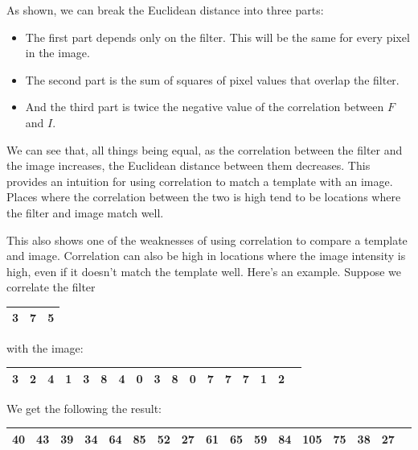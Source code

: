 \documentclass{report}
\begin{document}
As shown, we can break the Euclidean distance into three parts:
\begin{itemize}
    \item The first part depends only on the filter. This will be the same for every pixel in the image.
    \item The second part is the sum of squares of pixel values that overlap the filter.
    \item And the third part is twice the negative value of the correlation between $F$ and $I$.
\end{itemize}

We can see that, all things being equal, as the correlation between the filter and the image increases, the Euclidean distance between them decreases. This provides an intuition for using correlation to match a template with an image. Places where the correlation between the two is high tend to be locations where the filter and image match well.

This also shows one of the weaknesses of using correlation to compare a template and image. Correlation can also be high in locations where the image intensity is high, even if it doesn't match the template well. Here's an example. Suppose we correlate the filter

\begin{table}[ht]
\centering
\label{my-label-5}
\begin{tabular}{|l|l|l|}
\hline
3 & 7 & 5 \\ \hline
\end{tabular}
\end{table}

with the image:

\begin{table}[ht]
\centering
\label{my-label-6}
\begin{tabular}{|l|l|l|l|l|l|l|l|l|l|l|l|l|l|l|l|l|}
\hline
3 & 2 & 4 & 1 & 3 & 8 & 4 & 0 & 3 & 8 & 0 & 7 & 7 & 7 & 1 & 2\\ \hline
\end{tabular}
\end{table}

We get the following the result:

\begin{table}[ht]
\centering
\label{my-label-7}
\begin{tabular}{|l|l|l|l|l|l|l|l|l|l|l|l|l|l|l|l|l|}
\hline
40 & 43 & 39 & 34 & 64 & 85 & 52 & 27 & 61 & 65 & 59 & 84 & 105 & 75 & 38 & 27 \\ \hline
\end{tabular}
\end{table}
\end{document}
